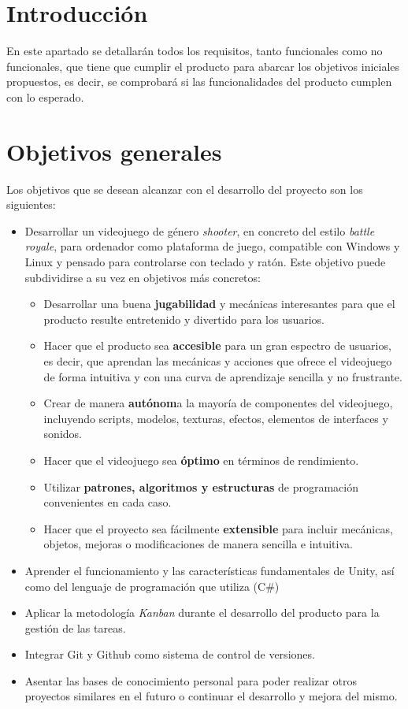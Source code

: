 
\section{Introducción}
En este apartado se detallarán todos los requisitos, tanto funcionales como no funcionales, que tiene que cumplir el producto para abarcar los objetivos iniciales propuestos, es decir, se comprobará si las funcionalidades del producto cumplen con lo esperado.
\section{Objetivos generales}
Los objetivos que se desean alcanzar con el desarrollo del proyecto son los siguientes:
\begin{itemize}
\tightlist
	\item Desarrollar un videojuego de género \textit{shooter}, en concreto del estilo \textit{battle royale}, para ordenador como plataforma de juego, compatible con Windows y Linux y pensado para controlarse con teclado y ratón. Este objetivo puede subdividirse a su vez en objetivos más concretos:
    	\begin{itemize}
    	\tightlist
    	\item Desarrollar una buena \textbf{jugabilidad} y mecánicas interesantes para que el producto resulte entretenido y divertido para los usuarios.
    	\item Hacer que el producto sea \textbf{accesible} para un gran espectro de usuarios, es decir, que aprendan las mecánicas y acciones que ofrece el videojuego de forma intuitiva y con una curva de aprendizaje sencilla y no frustrante.
    	\item Crear de manera \textbf{autónom}a la mayoría de componentes del videojuego, incluyendo scripts, modelos, texturas, efectos, elementos de interfaces y sonidos.
    	\item Hacer que el videojuego sea \textbf{óptimo} en términos de rendimiento.
    	\item Utilizar \textbf{patrones, algoritmos y estructuras} de programación convenientes en cada caso.
    	\item Hacer que el proyecto sea fácilmente \textbf{extensible} para incluir mecánicas, objetos, mejoras o modificaciones de manera sencilla e intuitiva.
    	\end{itemize}
	\item Aprender el funcionamiento y las características fundamentales de Unity, así como del lenguaje de programación que utiliza (C\#)
	\item Aplicar la metodología \textit{Kanban} durante el desarrollo del producto para la gestión de las tareas.
	\item Integrar Git y Github como sistema de control de versiones.
	\item Asentar las bases de conocimiento personal para poder realizar otros proyectos similares en el futuro o continuar el desarrollo y mejora del mismo.
\end{itemize}
